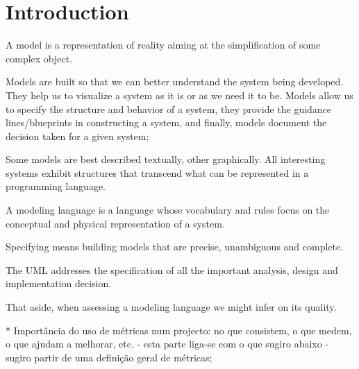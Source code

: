 \section{Introduction}

\indent
\par A model is a representation of reality aiming at the simplification of some complex object.

\par Models are built so that we can better understand the system being developed.
They help us to visualize a system as it is or as we need it to be. Models allow us to specify the structure and behavior of a system, they provide the guidance lines/blueprints in constructing a system, and finally, models document the decision taken for a given system;


\par Some models are best described textually, other graphically. All interesting systems exhibit structures that transcend what can be represented in a programming language.


\par A modeling language is a language whose vocabulary and rules focus on the conceptual and physical representation of a system.%

\par Specifying means building models that are precise, unambiguous and complete. 

The UML addresses the specification of all the important analysis, design and implementation decision. %


\par That aside, when assessing a modeling language we might infer on its quality.



    * Importância do uso de métricas num projecto: no que consistem, o que medem, o que ajudam a melhorar, etc. - esta parte liga-se com o que sugiro abaixo - sugiro partir de uma definição geral de métricas;\\
    
